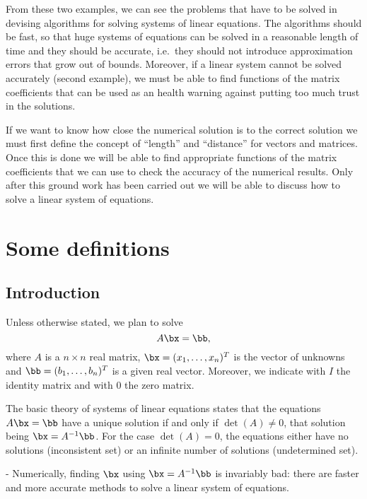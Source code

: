 From these two examples, we can see the problems that have to
be solved in   devising  algorithms  for  solving systems  of   linear
equations.  The algorithms  should be fast, so   that huge systems  of
equations can be solved in a reasonable length of time and they should
be accurate, i.e.\ they  should not introduce approximation errors that
grow out of  bounds.  Moreover, if a linear  system cannot be  solved
accurately (second example), we must be  able to find functions of the
matrix coefficients that  can  be used as   an health warning  against
putting too much trust in the solutions.

If we want to know how close the  numerical solution is to the correct
solution we  must    first define  the   concept  of  ``length''   and
``distance'' for vectors  and matrices.  Once this is  done we will be
able to find appropriate functions of  the matrix coefficients that we
can use to  check the accuracy of  the numerical results.   Only after
this ground work has been  carried out we will be  able to discuss how
to solve a linear system of equations.

\section{Some definitions}

\subsection{Introduction}

Unless otherwise stated, we plan to solve 
%
\begin{equation*}
  A \bx = \bb ,
\end{equation*}
%
where $A$ is a $n \times n$ real  matrix, $\bx = (x_1, \ldots, x_n)^T$
is the vector of unknowns and $\bb = (b_1, \ldots,  b_n)^T$ is a given
real vector.  Moreover,  we indicate with $I$  the identity matrix and
with $0$ the zero matrix.

The basic theory of systems of linear equations states that the
equations $A \bx = \bb $ have a unique solution if and only if
$\det(A) \ne 0$, that solution being $\bx = A^{-1} \bb$.  For the case
$\det(A) = 0$, the equations either have no solutions (inconsistent
set) or an infinite number of solutions (undetermined set).

\smallskip

 - Numerically, finding $\bx$ using $\bx = 
A^{-1} \bb$ is invariably bad: there are faster and more accurate
methods to solve a linear system of equations.

